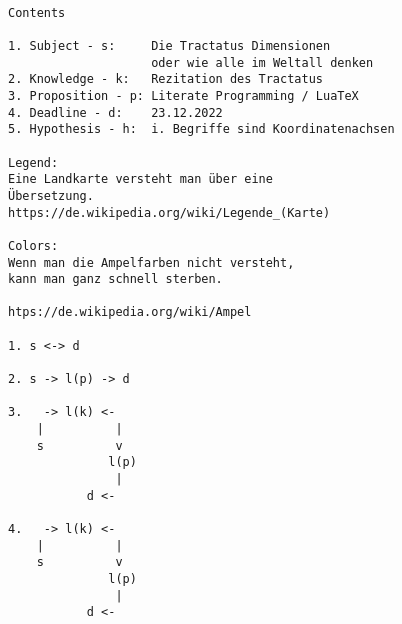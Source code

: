 \documentclass[10pt,a4paper]{article}
\begin{document}
\vskip 16pt


\begin{verbatim}

Contents

1. Subject - s:     Die Tractatus Dimensionen
                    oder wie alle im Weltall denken
2. Knowledge - k:   Rezitation des Tractatus
3. Proposition - p: Literate Programming / LuaTeX
4. Deadline - d:    23.12.2022
5. Hypothesis - h:  i. Begriffe sind Koordinatenachsen

Legend:
Eine Landkarte versteht man über eine
Übersetzung.
https://de.wikipedia.org/wiki/Legende_(Karte)

Colors:
Wenn man die Ampelfarben nicht versteht,
kann man ganz schnell sterben.

htps://de.wikipedia.org/wiki/Ampel

1. s <-> d

2. s -> l(p) -> d

3.   -> l(k) <-
    |          |
    s          v
              l(p)
               |
           d <-

4.   -> l(k) <-
    |          |
    s          v
              l(p)
               |
           d <-

\end{verbatim}
\end{document}
